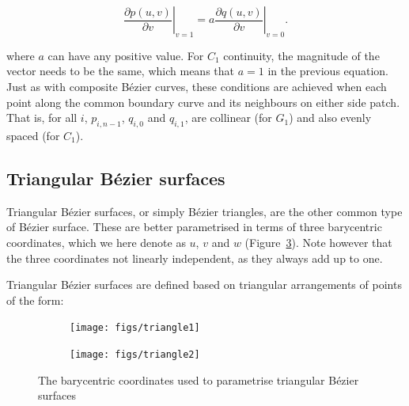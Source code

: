 \begin{equation}
\left. \frac{\partial p(u,v)}{\partial v} \right|_{v=1} = a \left. \frac{\partial q(u,v)}{\partial v} \right|_{v=0}.
\end{equation}

where \(a\) can have any positive value.
For \(C_1\) continuity, the magnitude of the vector needs to be the same, which means that \(a = 1\) in the previous equation.
Just as with composite B\'ezier curves, these conditions are achieved when each point along the common boundary curve and its neighbours on either side patch.
That is, for all \(i\), \(p_{i, n-1}\), \(q_{i, 0}\) and \(q_{i, 1}\), are collinear (for \(G_1\)) and also evenly spaced (for \(C_1\)). 

\subsection{Triangular B\'ezier surfaces}

Triangular B\'ezier surfaces, or simply B\'ezier triangles, are the other common type of B\'ezier surface.
These are better parametrised in terms of three barycentric coordinates, which we here denote as \(u\), \(v\) and \(w\) (Figure~\ref{fig:triangle}).
Note however that the three coordinates not linearly independent, as they always add up to one.

Triangular B\'ezier surfaces are defined based on triangular arrangements of points of the form:

\begin{figure}
\centering
\begin{subfigure}{0.5\linewidth}
\texttt{[image: figs/triangle1]}
\caption{}%
\label{subfig:triangle1}
\end{subfigure}%
\begin{subfigure}{0.5\linewidth}
\texttt{[image: figs/triangle2]}
\caption{}%
\label{subfig:triangle2}
\end{subfigure}%
\caption{The barycentric coordinates used to parametrise triangular B\'ezier surfaces}%
\label{fig:triangle}
\end{figure}

